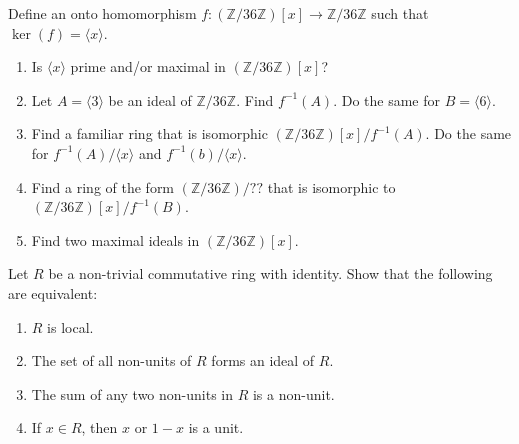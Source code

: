 \documentclass[12pt,letterpaper,boxed]{hmcpset}
\begin{document}
\begin{problem}[18.1.26]
Define an onto homomorphism $f: (\mathbb{Z}/36\mathbb{Z})[x] \rightarrow \mathbb{Z}/36\mathbb{Z}$ such that $\ker(f) = \langle x \rangle$.
\begin{enumerate}[label=\alph*]
\item Is $\langle x \rangle$ prime and/or maximal in $(\mathbb{Z}/36\mathbb{Z})[x]$?
\item Let $A = \langle 3 \rangle$ be an ideal of $\mathbb{Z}/36\mathbb{Z}$. Find $f^{-1}(A)$. Do the same for $B = \langle 6 \rangle$.
\item Find a familiar ring that is isomorphic $(\mathbb{Z}/36\mathbb{Z})[x]/f^{-1}(A)$. Do the same for $f^{-1}(A)/\langle x \rangle$ and $f^{-1}(b)/\langle x \rangle$. 
\item Find a ring of the form $(\mathbb{Z}/36\mathbb{Z})/??$ that is isomorphic to $(\mathbb{Z}/36\mathbb{Z})[x]/f^{-1}(B)$.
\item Find two maximal ideals in $(\mathbb{Z}/36\mathbb{Z})[x]$.
\end{enumerate}
\end{problem}

\begin{solution}
\end{solution}

\clearpage

\begin{problem}[18.6.1]
Let $R$ be a non-trivial commutative ring with identity. Show that the following are equivalent: 
\begin{enumerate}[label=\alph*]
\item $R$ is local.
\item The set of all non-units of $R$ forms an ideal of $R$.
\item The sum of any two non-units in $R$ is a non-unit.
\item If $x \in R$, then $x$ or $1-x$ is a unit.
\end{enumerate}
\end{problem}

\begin{solution}
\end{solution}
\end{document}
